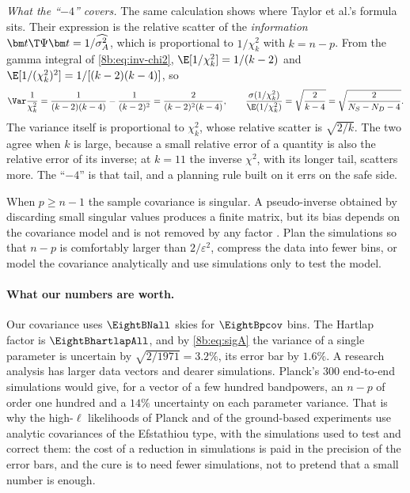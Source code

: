 \emph{What the ``$-4$'' covers.} The same calculation shows where Taylor et al.'s formula sits. Their
expression is the relative scatter of the \emph{information} $\bm t\T\Psi\bm t=1/\widehat{\sigma^2_A}$, which is proportional to
$1/\chi^2_k$ with $k=n-p$. From the gamma integral of \eqref{8b:eq:inv-chi2}, $\E[1/\chi^2_k]=1/(k-2)$ and
$\E[1/(\chi^2_k)^2]=1/[(k-2)(k-4)]$, so
\[
  \Var\frac1{\chi^2_k}=\frac1{(k-2)(k-4)}-\frac1{(k-2)^2}=\frac2{(k-2)^2(k-4)},\qquad
  \frac{\sigma(1/\chi^2_k)}{\E(1/\chi^2_k)}=\sqrt{\frac2{k-4}}=\sqrt{\frac2{N_S-N_D-4}} .
\]
The variance itself is proportional to $\chi^2_k$, whose relative scatter is $\sqrt{2/k}$. The two agree when
$k$ is large, because a small relative error of a quantity is also the relative error of its inverse;
at $k=11$ the inverse $\chi^2$, with its longer tail, scatters more. The ``$-4$'' is that tail, and a planning
rule built on it errs on the safe side.

\begin{pitfall}
When $p\ge n-1$ the sample covariance is singular. A pseudo-inverse obtained by discarding small singular
values produces a finite matrix, but its bias depends on the covariance model and is not removed by any
factor \cite[§3.2]{Hartlap2007}. Plan the simulations so that $n-p$ is comfortably larger than
$2/\varepsilon^2$, compress the data into fewer bins, or model the covariance analytically and use simulations only
to test the model.
\end{pitfall}

\paragraph{What our numbers are worth.}
Our covariance uses $\EightBNall$ skies for $\EightBpcov$ bins. The Hartlap factor is $\EightBhartlapAll$, and by
\eqref{8b:eq:sigA} the variance of a single parameter is uncertain by $\sqrt{2/1971}=3.2\%$, its error bar by
$1.6\%$. A research analysis has larger data vectors and dearer simulations. Planck's $300$ end-to-end
simulations \cite{Planck2018V} would give, for a vector of a few hundred bandpowers, an $n-p$ of order
one hundred and a $14\%$ uncertainty on each parameter variance. That is why the high-$\ell$ likelihoods of
Planck and of the ground-based experiments use analytic covariances of the Efstathiou type, with the
simulations used to test and correct them: the cost of a reduction in simulations is paid in the
precision of the error bars, and the cure is to need fewer simulations, not to pretend that a small
number is enough.
